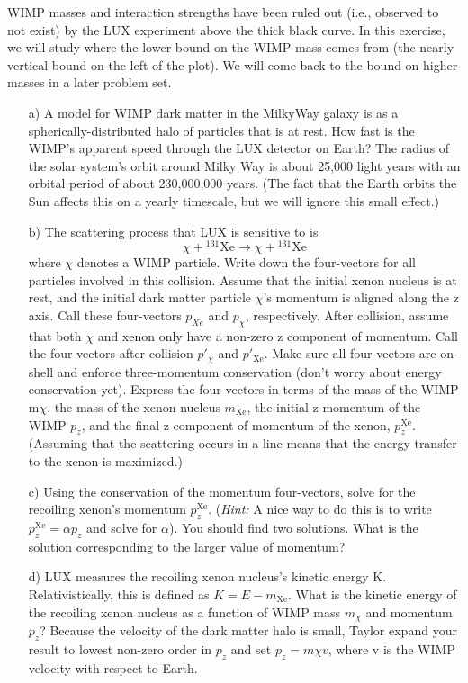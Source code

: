 {WIMP masses and interaction strengths have been ruled out (i.e., observed to not exist) by the LUX experiment above the thick black curve. 
In this exercise, we will study where the lower bound on the WIMP mass comes from (the nearly vertical bound on the left of the plot).
We will come back to the bound on higher masses in a later problem set. 

\begin{itemize}
\item[a)]
A model for WIMP dark matter in the MilkyWay galaxy is as a spherically-distributed halo of particles that is at rest. 
How fast is the WIMP’s apparent speed through the LUX detector on Earth? 
The radius of the solar system’s orbit around Milky Way is about 25,000 light years with an orbital period of about 230,000,000 years. 
(The fact that the Earth orbits the Sun affects this on a yearly timescale, but we will ignore this small effect.)
\item[b)]
The scattering process that LUX is sensitive to is
\begin{equation*}
\chi + \mathrm{^{131}Xe} \rightarrow \chi + \mathrm{^{131}Xe}
\end{equation*}
where $\chi$ denotes a WIMP particle. 
Write down the four-vectors for all particles involved in this collision. 
Assume that the initial xenon nucleus is at rest, and the initial dark matter particle $\chi$’s momentum is aligned along the z axis. 
Call these four-vectors $p_{Xe}$ and $p_\chi$, respectively. 
After collision, assume that both $\chi$ and xenon only have a non-zero z component of momentum. 
Call the four-vectors after collision $p'_\chi$ and $p'_{\mathrm{Xe}}$. 
Make sure all four-vectors are on-shell and enforce three-momentum conservation (don’t worry about energy conservation yet). 
Express the four vectors in terms of the mass of the WIMP m$\chi$, the mass of the xenon nucleus $m_{\mathrm{Xe}}$, the initial z momentum of the WIMP $p_z$, and the final z component of momentum of the xenon, $p^{\mathrm{Xe}}_z$. 
(Assuming that the scattering occurs in a line means that the energy transfer to the xenon is maximized.)
\item[c)]
Using the conservation of the momentum four-vectors, solve for the recoiling xenon’s momentum $p^{\mathrm{Xe}}_z$.
(\textit{Hint:} A nice way to do this is to write $p^{\mathrm{Xe}}_z = \alpha p_z$ and solve for $\alpha$).
You should find two solutions. 
What is the solution corresponding to the larger value of momentum?
\item[d)]
LUX measures the recoiling xenon nucleus’s kinetic energy K. 
Relativistically, this is defined as $K = E-m_{\mathrm{Xe}}$. 
What is the kinetic energy of the recoiling xenon nucleus as a function of WIMP mass $m_\chi$ and momentum $p_z$? 
Because the velocity of the dark matter halo is small, Taylor expand your result to lowest non-zero order in $p_z$ and set $p_z = m\chi v$, where v is the WIMP velocity with respect to Earth.


\end{itemize}}
